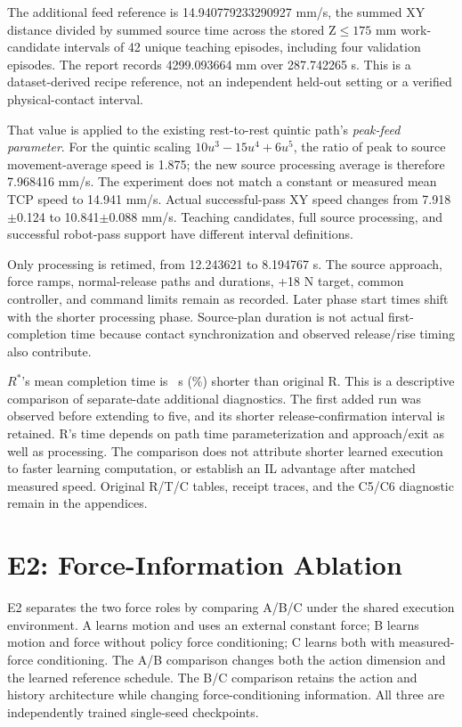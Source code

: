 The additional feed reference is 14.940779233290927 mm/s, the summed XY distance divided by summed source time across the stored Z\(\leq175\) mm work-candidate intervals of 42 unique teaching episodes, including four validation episodes. The report records 4299.093664 mm over 287.742265 s. This is a dataset-derived recipe reference, not an independent held-out setting or a verified physical-contact interval.

That value is applied to the existing rest-to-rest quintic path's \emph{peak-feed parameter}. For the quintic scaling \(10u^3-15u^4+6u^5\), the ratio of peak to source movement-average speed is 1.875; the new source processing average is therefore 7.968416 mm/s. The experiment does not match a constant or measured mean TCP speed to 14.941 mm/s. Actual successful-pass XY speed changes from 7.918\(\pm\)0.124 to 10.841\(\pm\)0.088 mm/s. Teaching candidates, full source processing, and successful robot-pass support have different interval definitions.

Only processing is retimed, from 12.243621 to 8.194767 s. The source approach, force ramps, normal-release paths and durations, +18 N target, common controller, and command limits remain as recorded. Later phase start times shift with the shorter processing phase. Source-plan duration is not actual first-completion time because contact synchronization and observed release/rise timing also contribute.

\(R^{*}\)'s mean completion time is \RstarTimeGain~s (\RstarTimePercent\%) shorter than original R. This is a descriptive comparison of separate-date additional diagnostics. The first added run was observed before extending to five, and its shorter release-confirmation interval is retained. R's time depends on path time parameterization and approach/exit as well as processing. The comparison does not attribute shorter learned execution to faster learning computation, or establish an IL advantage after matched measured speed. Original R/T/C tables, receipt traces, and the C5/C6 diagnostic remain in the appendices.

\FloatBarrier
\section{E2: Force-Information Ablation}
E2 separates the two force roles by comparing A/B/C under the shared execution environment. A learns motion and uses an external constant force; B learns motion and force without policy force conditioning; C learns both with measured-force conditioning. The A/B comparison changes both the action dimension and the learned reference schedule. The B/C comparison retains the action and history architecture while changing force-conditioning information. All three are independently trained single-seed checkpoints.


